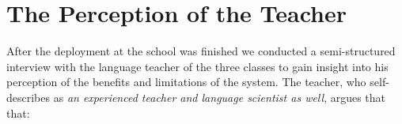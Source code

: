 
\newcommand{\q}[1]{($Q_#1$)}
\newcommand{\qq}[2]{($Q_#1,Q_{#2}$)}

\newpage
\section{The Perception of the Teacher}
After the deployment at the school was finished we conducted a semi-structured interview with the language teacher of the three classes to gain insight into his perception of the benefits and limitations of the system. 
% 
The teacher, who self-describes as {\em an experienced teacher and language scientist as well}, argues that that: 


